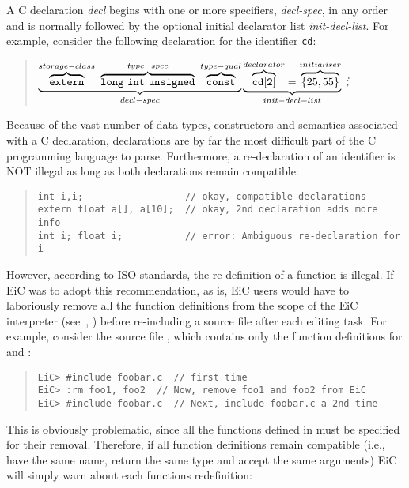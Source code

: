 A C declaration {\it decl} begins with one or more specifiers, {\it
decl-spec}, in any order and is normally followed by the optional
initial declarator list {\it init-decl-list}. For example, consider
the following declaration for the identifier {\tt cd}:

\begin{quote}
        $\underbrace{\overbrace{\tt extern}^{storage-class}\ \overbrace{\tt long\ int\ unsigned}^{type-spec}\ \overbrace{\tt const}^{type-qual}}_{decl-spec} \underbrace{\overbrace{\tt cd[2]}^{declarator} = \overbrace{\{25,55\}}^{initialiser}}_{init-decl-list}\ $\U{;}

\end{quote}

Because of the vast number of data types, constructors and semantics
associated with a C declaration, declarations are by far the most
difficult part of the C programming language to parse. Furthermore, a
re-declaration of an identifier is NOT illegal as long as both
declarations remain compatible:

\begin{quote}
\begin{verbatim}
int i,i;                  // okay, compatible declarations
extern float a[], a[10];  // okay, 2nd declaration adds more info
int i; float i;           // error: Ambiguous re-declaration for i
\end{verbatim}
\end{quote}

However, according to ISO standards, the re-definition of a function
is illegal.  If EiC was to adopt this recommendation, as is, EiC
users would have to laboriously remove all the function definitions
from the scope of the EiC interpreter (see~,
) before re-including a source file after each editing
task. For example, consider the source file , which contains
only the function definitions for
 and :
\begin{quote}
\begin{verbatim}
EiC> #include foobar.c  // first time
EiC> :rm foo1, foo2  // Now, remove foo1 and foo2 from EiC
EiC> #include foobar.c  // Next, include foobar.c a 2nd time
\end{verbatim}
\end{quote}

This is obviously problematic, since all the functions defined in
 must be specified for their removal.  Therefore, if all
function definitions remain compatible (i.e., have the same name,
return the same type and accept the same arguments) EiC will simply
warn about each functions redefinition:

